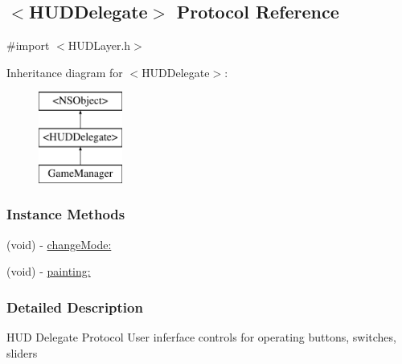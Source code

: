 \hypertarget{protocol_h_u_d_delegate-p}{\subsection{$<$H\-U\-D\-Delegate$>$ Protocol Reference}
\label{d4/db1/protocol_h_u_d_delegate-p}
}


{\ttfamily \#import $<$H\-U\-D\-Layer.\-h$>$}

Inheritance diagram for $<$H\-U\-D\-Delegate$>$\-:\begin{figure}[H]
\begin{center}
\leavevmode
\includegraphics[height=3.000000cm]{d4/db1/protocol_h_u_d_delegate-p}
\end{center}
\end{figure}
\subsubsection*{Instance Methods}
\begin{DoxyCompactItemize}
\item 
(void) -\/ \hyperlink{protocol_h_u_d_delegate-p_a9eb11385bd55a3f61fcd752d154bcc81}{change\-Mode\-:}
\item 
(void) -\/ \hyperlink{protocol_h_u_d_delegate-p_a2bef4ad83cca602f9c241bbb90f86ab7}{painting\-:}
\end{DoxyCompactItemize}


\subsubsection{Detailed Description}
H\-U\-D Delegate Protocol User inferface controls for operating buttons, switches, sliders 

